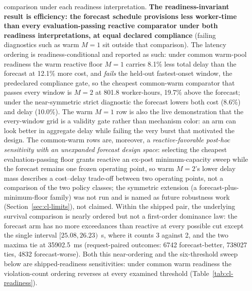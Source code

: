 comparison under each readiness interpretation.
\textbf{The readiness-invariant result is efficiency: the forecast
schedule provisions less worker-time than every evaluation-passing
reactive comparator under both readiness interpretations, at equal
declared compliance} (failing diagnostics such as warm $M{=}1$ sit
outside that comparison). The latency
ordering is readiness-conditional and reported as such: under common
warm-pool readiness the warm reactive floor $M{=}1$ carries 8.1\% less
total delay than the forecast at 12.1\% more cost, and \emph{fails}
the held-out fastest-onset window, the predeclared compliance gate, so the cheapest
common-warm comparator that passes every window is $M{=}2$ at \num{801.8}
worker-hours, 19.7\% above the forecast; under the near-symmetric strict
diagnostic the forecast lowers both cost (8.6\%) and delay (10.0\%). The
warm $M{=}1$ row is also the live demonstration that the every-window grid
is a validity gate rather than mechanism color: an arm can look better in
aggregate delay while failing the very burst that motivated the design.
The common-warm rows are, moreover, a \emph{reactive-favorable post-hoc
sensitivity with an unexpanded forecast design space}: selecting the
cheapest evaluation-passing floor grants reactive an ex-post
minimum-capacity sweep while the forecast remains one frozen operating
point, so warm $M{=}2$'s lower delay mass describes a cost--delay
trade-off between two operating points, not a comparison of the two
policy classes; the symmetric extension (a forecast-plus-minimum-floor
family) was not run and is named as future robustness work
(Section~\ref{sec:cl-limits}), not claimed.
Within the shipped pair, the underlying survival comparison is nearly
ordered but not a first-order dominance law: the forecast arm has no more
exceedances than reactive at every possible cut except the single
interval $[\num{25.08}, \num{26.23})$~s, where it counts 3 against 2, and
the two maxima tie at \SI{35902.5}{\milli\second} (request-paired
outcomes: \num{6742} forecast-better, \num{738027} ties, \num{4832}
forecast-worse). Both this near-ordering and the six-threshold sweep
below are shipped-readiness sensitivities: under common warm readiness
the violation-count ordering reverses at every examined threshold
(Table~\ref{tab:cl-readiness}).

